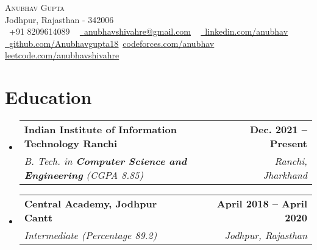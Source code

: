 \documentclass[letterpaper,11pt]{article}
\makeatletter
\newcommand{\resumeSubheading}[4]{
  \vspace{-2pt}\item
    \begin{tabular*}{1.0\textwidth}[t]{l@{\extracolsep{\fill}}r}
      \textbf{#1} & \textbf{\small #2} \\
      \textit{\small#3} & \textit{\small #4} \\
    \end{tabular*}\vspace{-7pt}
}
\newcommand{\resumeSubHeadingListStart}{\begin{itemize}[leftmargin=0.0in, label={}]}
\newcommand{\resumeSubHeadingListEnd}{\end{itemize}}
\makeatother
\begin{document}

    {\vspace{+9pt}\Huge \scshape Anubhav Gupta} \\ \vspace{+6pt}
    Jodhpur, Rajasthan - 342006 \\ \vspace{+6pt}
    \small \raisebox{-0.1\height}\faPhone\ +91 8209614089 ~ \href{mailto:anubhavshivahre@gmail.com}{\raisebox{-0.2\height}\faEnvelope\  \underline{anubhavshivahre@gmail.com}} ~
    \href{https://www.linkedin.com/in/anubhav-gupta17/}{\raisebox{-0.2\height}\faLinkedin\ \underline{linkedin.com/anubhav}}  ~
    \href{https://github.com/Anubhavgupta18}{\raisebox{-0.2\height}\faGithub\ \underline{github.com/Anubhavgupta18}}\
    \href{https://codeforces.com/profile/anubhav_gupta17}{\underline{codeforces.com/anubhav}}
    \href{https://leetcode.com/anubhavshivahre}{\underline{leetcode.com/anubhavshivahre}}\
    \vspace{+2pt}


\section{Education}
\vspace{+4pt}
  \resumeSubHeadingListStart
    \resumeSubheading
      {Indian Institute of Information Technology Ranchi}{Dec. 2021 -- Present}
      {B. Tech. in \textbf{Computer Science and Engineering} (CGPA 8.85)}{Ranchi, Jharkhand}
    \resumeSubheading{Central Academy, Jodhpur Cantt}{April 2018 -- April 2020}
    {Intermediate (Percentage 89.2) }{Jodhpur, Rajasthan}
  \resumeSubHeadingListEnd
\end{document}
